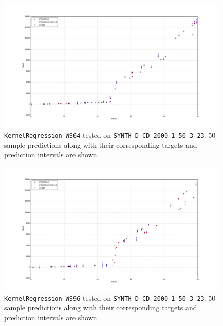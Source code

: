 \begin{figure}[htbp]
  \centering
    \includegraphics[width=\linewidth]{./Figures/sampled_50_predictions_kreg_ws64_SYNTH_D_CD_2000_1_50_3_23.pdf}
  \caption{\texttt{KernelRegression\_WS64} tested on \texttt{SYNTH\_D\_CD\_2000\_1\_50\_3\_23}. 50 sample predictions along with their corresponding targets and prediction intervals are shown}
 \label{fig:sampled_50_predictions_kreg_ws64_SYNTH_D_CD_2000_1_50_3_23}
\end{figure}

\begin{figure}[htbp]
  \centering
    \includegraphics[width=\linewidth]{./Figures/sampled_50_predictions_kreg_ws96_SYNTH_D_CD_2000_1_50_3_23.pdf}
  \caption{\texttt{KernelRegression\_WS96} tested on \texttt{SYNTH\_D\_CD\_2000\_1\_50\_3\_23}. 50 sample predictions along with their corresponding targets and prediction intervals are shown}
 \label{fig:sampled_50_predictions_kreg_ws96_SYNTH_D_CD_2000_1_50_3_23}
\end{figure}

